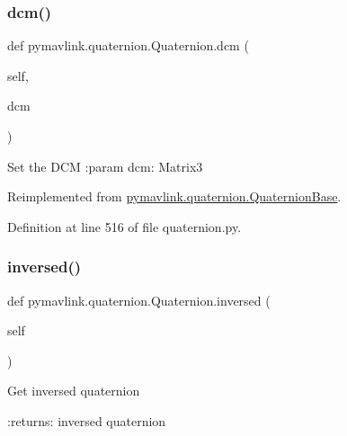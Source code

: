 \mbox{\label{classpymavlink_1_1quaternion_1_1Quaternion_a2223bcf5392e9fc3980e012074318707}} 
\subsubsection{\texorpdfstring{dcm()}{dcm()}\hspace{0.1cm}{\footnotesize\ttfamily [2/2]}}
{\footnotesize\ttfamily def pymavlink.\+quaternion.\+Quaternion.\+dcm (\begin{DoxyParamCaption}\item[{}]{self,  }\item[{}]{dcm }\end{DoxyParamCaption})}

\begin{DoxyVerb}Set the DCM
:param dcm: Matrix3\end{DoxyVerb}
 

Reimplemented from \mbox{\hyperlink{classpymavlink_1_1quaternion_1_1QuaternionBase_a2da4adc7fb783fe3d4e3c4d92f3ac91e}{pymavlink.\+quaternion.\+Quaternion\+Base}}.



Definition at line 516 of file quaternion.\+py.

\mbox{\label{classpymavlink_1_1quaternion_1_1Quaternion_a0dd030159c7d726fad2cb12fd4c3983a}} 
\subsubsection{\texorpdfstring{inversed()}{inversed()}}
{\footnotesize\ttfamily def pymavlink.\+quaternion.\+Quaternion.\+inversed (\begin{DoxyParamCaption}\item[{}]{self }\end{DoxyParamCaption})}

\begin{DoxyVerb}Get inversed quaternion

:returns: inversed quaternion
\end{DoxyVerb}
 


